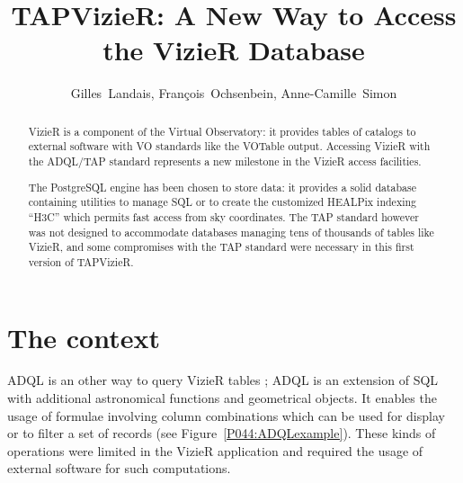 
\resetcounters



\resetcounters

\title{TAPVizieR: A New Way to Access the VizieR Database}
\author{Gilles~Landais, Fran\c cois~Ochsenbein, Anne-Camille~Simon
}


\begin{abstract}
VizieR is a component of the Virtual Observatory: it provides tables of catalogs to external software with VO standards like the VOTable output. Accessing VizieR with the ADQL/TAP standard represents a new milestone in the VizieR access facilities.

The PostgreSQL engine has been chosen to store data: it provides a solid database containing utilities to manage SQL or to create the customized HEALPix indexing ``H3C'' which permits fast access from sky coordinates. The TAP standard however was not designed to accommodate databases managing tens of thousands of tables like VizieR, and some compromises with the TAP standard were necessary in this first version of TAPVizieR.
\end{abstract}

\section{The context}

ADQL \citep{adql_2011} is an other way to query VizieR tables \citep{ochsenbein_2000}; ADQL is an extension of SQL with additional astronomical functions and geometrical objects. It enables the usage of formulae involving column combinations which can be used for display or to filter a set of records (see Figure~\ref{P044:ADQLexample}). These kinds of operations were limited in the VizieR application and required the usage of external software for such computations.

